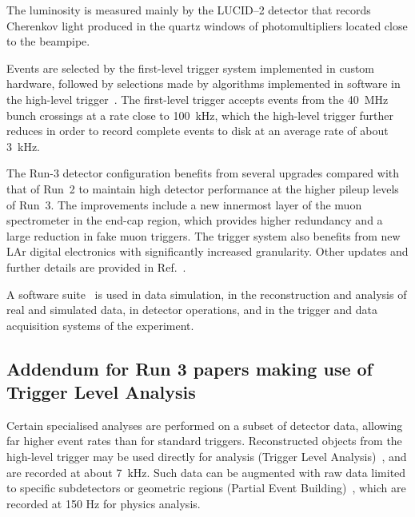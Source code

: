 The luminosity is measured mainly by the LUCID--2 detector that records Cherenkov light produced in the quartz windows of photomultipliers located close to the beampipe.

Events are selected by the first-level trigger system implemented in custom hardware,
followed by selections made by algorithms implemented in software in the high-level trigger~\cite{TRIG-2022-01}. 
The first-level trigger accepts events from the \qty{40}{\MHz} bunch crossings at a rate close to \qty{100}{\kHz},
which the high-level trigger further reduces in order to record complete events to disk at an average rate of about \qty{3}{\kHz}.

The Run-3 detector configuration benefits from several upgrades compared with that of Run~2 to maintain high detector performance at the higher pileup levels of Run~3. The improvements include a new innermost layer of the muon spectrometer in the end-cap region, which provides higher redundancy and a large reduction in fake muon triggers. The trigger system also benefits from new LAr digital electronics with significantly increased granularity. Other updates and further details are provided in Ref.~\cite{GENR-2019-02}.

A software suite~\cite{SOFT-2022-02} is used in data simulation, in the reconstruction
and analysis of real and simulated data, in detector operations, and in the trigger and data acquisition
systems of the experiment.

\subsection{Addendum for Run 3 papers making use of Trigger Level Analysis}
\label{sec:atlas3tlapeb}

Certain specialised analyses are performed on a subset of detector data,
allowing far higher event rates than for standard triggers.
Reconstructed objects from the high-level trigger may be used directly for analysis
(Trigger Level Analysis)~\cite{EXOT-2016-20}, and are recorded at about \qty{7}{\kHz}.
Such data can be augmented with raw data limited to specific subdetectors or geometric regions
(Partial Event Building)~\cite{TRIG-2016-01}, which are recorded at 150 Hz for physics analysis.


